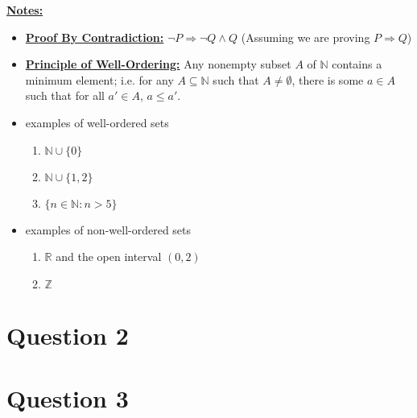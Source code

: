 \documentclass[12pt]{article}
\begin{document}




\bigskip

\underline{\textbf{Notes:}}

\begin{itemize}
    \item \underline{\textbf{Proof By Contradiction:}} $\neg P \Rightarrow \neg Q \land Q$ (Assuming
    we are proving $P \Rightarrow Q$)
    \item \underline{\textbf{Principle of Well-Ordering:}} Any nonempty subset $A$
    of $\mathbb{N}$ contains a minimum element; i.e. for any $A \subseteq \mathbb{N}$
    such that $A \neq \emptyset$, there is some $a \in A$ such that for all $a' \in A$, $a \leq a'$.

    \item examples of well-ordered sets
    \begin{enumerate}[1.]
        \item $\mathbb{N} \cup \{0\}$
        \item $\mathbb{N} \cup \{1,2\}$
        \item $\{n \in \mathbb{N}: n > 5\}$
    \end{enumerate}
    \item examples of non-well-ordered sets
    \begin{enumerate}[1.]
        \item $\mathbb{R}$ and the open interval $(0,2)$
        \item $\mathbb{Z}$
    \end{enumerate}
\end{itemize}

\section*{Question 2}

\section*{Question 3}
\end{document}
